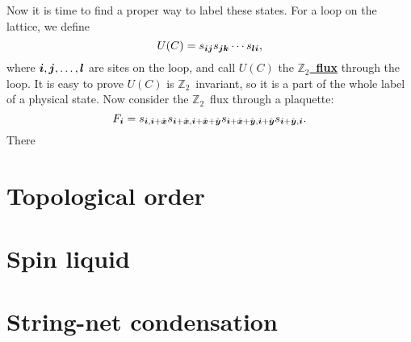 \documentclass[hyperref, a4paper]{article}
\newcommand*{\concept}[1]{\underline{\textbf{#1}}}
\newcommand*{\Ztwo}{$\mathbb{Z}_2$\ }
\begin{document}
Now it is time to find a proper way to label these states.
For a loop on the lattice, we define
\begin{equation}
    U(C) = s_{\vb*{i} \vb*{j}} s_{\vb*{j} \vb*{k}} \cdots s_{\vb*{l} \vb*{i}},
\end{equation}
where $\vb*{i}, \vb*{j}, \ldots, \vb*{l}$ are sites on the loop, and call $U(C)$ the \concept{\Ztwo flux} through the loop. 
It is easy to prove $U(C)$ is \Ztwo invariant, so it is a part of the whole label of a physical state.
Now consider the \Ztwo flux through a plaquette:
\begin{equation}
    F_{\vb*{i}} = s_{\vb*{i}, \vb*{i}+\hat{\vb*{x}}} s_{\vb*{i}+\hat{\vb*{x}}, \vb*{i}+\hat{\vb*{x}}+\hat{\vb*{y}}} s_{\vb*{i}+\hat{\vb*{x}}+\hat{\vb*{y}}, \vb*{i}+\hat{\vb*{y}}} s_{\vb*{i}+\hat{\vb*{y}}, \vb*{i}}.
\end{equation}
There 

\section{Topological order}

\section{Spin liquid}

\section{String-net condensation}
\end{document}
